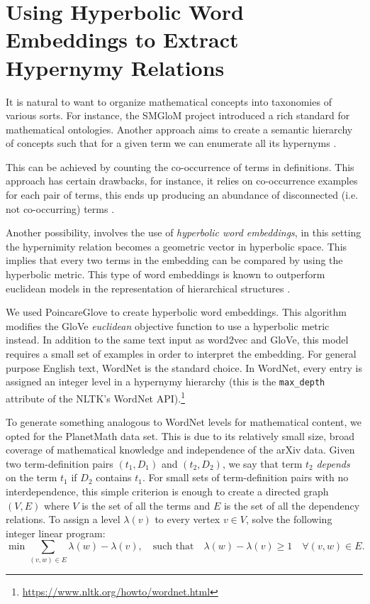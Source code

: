 \documentclass[submission,copyright,creativecommons]{eptcs}
\begin{document}
\section{Using Hyperbolic Word Embeddings to Extract Hypernymy Relations}
It is natural to want to organize mathematical concepts into taxonomies of various sorts.
For instance, the SMGloM project \cite{ginev2016smglom} introduced a rich standard for mathematical ontologies. Another approach aims to create a semantic hierarchy of concepts such that for a given term we can enumerate all its hypernyms \cite{wang-etal-2017-short}.

This can be  achieved by counting the co-occurrence \cite{hearst-1992-automatic} of terms in definitions. This approach has certain drawbacks, for instance, it relies on co-occurrence examples for each pair of terms, this ends up producing an abundance of disconnected (i.e. not co-occurring) terms \cite{aly-etal-2019-every}.

Another possibility, involves the use of \emph{hyperbolic word embeddings}, in this setting the hypernimity relation becomes a geometric vector in hyperbolic space. This implies that every two terms in the embedding can be compared by using the hyperbolic metric.
This type of word embeddings is known to outperform euclidean models in the representation of hierarchical structures \cite{DBLP:conf/nips/NickelK17}.

We used PoincareGlove \cite{DBLP:conf/iclr/TifreaBG19} to create hyperbolic
word embeddings. This algorithm modifies the GloVe \textit{euclidean} objective function to use a hyperbolic metric instead. 
In addition to the same text input as word2vec and GloVe, this model requires a small set of examples in order to interpret the embedding. 
For general purpose English text, WordNet \cite{wordnet} is the standard  choice. 
In WordNet, every entry is assigned an integer level in a hypernymy hierarchy (this is the
\texttt{max\_depth} attribute of the NLTK's WordNet
API).\footnote{\url{https://www.nltk.org/howto/wordnet.html}} 

To generate something  analogous to WordNet levels for mathematical content, we opted for the PlanetMath data set. This is due to its relatively small size, broad coverage of mathematical knowledge and independence of the arXiv data. 
 Given two term-definition pairs $(t_1, D_1)$ and $(t_2, D_2)$, we say that term
$t_2$ \emph{depends} on the term $t_1$ if $D_2$ contains $t_1$.
For small sets of term-definition pairs with no interdependence, this
simple criterion is enough to create a directed graph $(V, E)$ where
$V$ is the set of all the terms and $E$ is the set of all the
dependency relations. To assign a level $\lambda (v)$ to every 
vertex $v\in V$, solve the following integer linear program:
$$\min  \sum_{(v,w) \in E} \lambda(w) - \lambda(v),  \quad \text{such that}  \quad \lambda(w) - \lambda(v) \geq 1\quad \forall (v,w) \in E. $$
\end{document}
